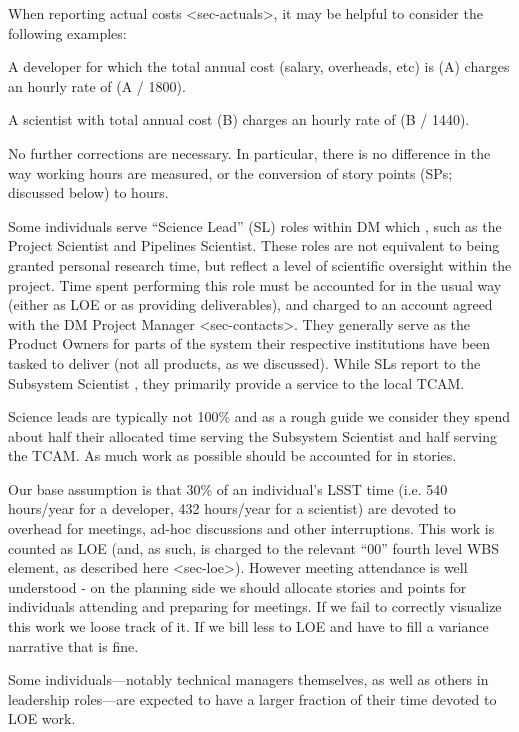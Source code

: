 When reporting actual costs \textless{}sec-actuals\textgreater{}, it may
be helpful to consider the following examples:

A developer for which the total annual cost (salary, overheads, etc) is
(A) charges an hourly rate of (A / 1800).

A scientist with total annual cost (B) charges an hourly rate of
(B / 1440).

No further corrections are necessary. In particular, there is no
difference in the way working hours are measured, or the conversion of
story points (SPs; discussed below) to hours.

Some individuals serve ``Science Lead'' (SL) roles within DM which ,
such as the Project Scientist and Pipelines Scientist. These roles are
not equivalent to being granted personal research time, but reflect a
level of scientific oversight within the project. Time spent performing
this role must be accounted for in the usual way (either as LOE or as
providing deliverables), and charged to an account agreed with the
DM Project Manager \textless{}sec-contacts\textgreater{}. They generally
serve as the Product Owners for parts of the system their respective
institutions have been tasked to deliver (not all products, as we
discussed). While SLs report to the Subsystem Scientist , they primarily
provide a service to the local TCAM.

Science leads are typically not 100\% and as a rough guide we consider
they spend about half their allocated time serving the Subsystem
Scientist and half serving the TCAM. As much work as possible should be
accounted for in stories.

Our base assumption is that 30\% of an individual's LSST time (i.e. 540
hours/year for a developer, 432 hours/year for a scientist) are devoted
to overhead for meetings, ad-hoc discussions and other interruptions.
This work is counted as LOE (and, as such, is charged to the relevant
``00'' fourth level WBS element, as described
here \textless{}sec-loe\textgreater{}). However meeting attendance is
well understood - on the planning side we should allocate stories and
points for individuals attending and preparing for meetings. If we fail
to correctly visualize this work we loose track of it. If we bill less
to LOE and have to fill a variance narrative that is fine.

Some individuals---notably technical managers themselves, as well as
others in leadership roles---are expected to have a larger fraction of
their time devoted to LOE work.


